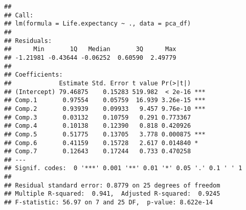 \documentclass[
]{article}
\newenvironment{Shaded}{\begin{snugshade}}{\end{snugshade}}
\newcommand{\AttributeTok}[1]{\textcolor[rgb]{0.13,0.29,0.53}{#1}}
\newcommand{\CommentTok}[1]{\textcolor[rgb]{0.56,0.35,0.01}{\textit{#1}}}
\newcommand{\DecValTok}[1]{\textcolor[rgb]{0.00,0.00,0.81}{#1}}
\newcommand{\DocumentationTok}[1]{\textcolor[rgb]{0.56,0.35,0.01}{\textbf{\textit{#1}}}}
\newcommand{\FunctionTok}[1]{\textcolor[rgb]{0.13,0.29,0.53}{\textbf{#1}}}
\newcommand{\NormalTok}[1]{#1}
\newcommand{\OtherTok}[1]{\textcolor[rgb]{0.56,0.35,0.01}{#1}}
\newcommand{\SpecialCharTok}[1]{\textcolor[rgb]{0.81,0.36,0.00}{\textbf{#1}}}
\begin{document}
\begin{Shaded}
\end{Shaded}

\begin{verbatim}
## 
## Call:
## lm(formula = Life.expectancy ~ ., data = pca_df)
## 
## Residuals:
##      Min       1Q   Median       3Q      Max 
## -1.21981 -0.43644 -0.06252  0.60590  2.49779 
## 
## Coefficients:
##             Estimate Std. Error t value Pr(>|t|)    
## (Intercept) 79.46875    0.15283 519.982  < 2e-16 ***
## Comp.1       0.97554    0.05759  16.939 3.26e-15 ***
## Comp.2       0.93939    0.09933   9.457 9.76e-10 ***
## Comp.3       0.03132    0.10759   0.291 0.773367    
## Comp.4       0.10138    0.12390   0.818 0.420926    
## Comp.5       0.51775    0.13705   3.778 0.000875 ***
## Comp.6       0.41159    0.15728   2.617 0.014840 *  
## Comp.7       0.12643    0.17244   0.733 0.470258    
## ---
## Signif. codes:  0 '***' 0.001 '**' 0.01 '*' 0.05 '.' 0.1 ' ' 1
## 
## Residual standard error: 0.8779 on 25 degrees of freedom
## Multiple R-squared:  0.941,  Adjusted R-squared:  0.9245 
## F-statistic: 56.97 on 7 and 25 DF,  p-value: 8.622e-14
\end{verbatim}
\end{document}
